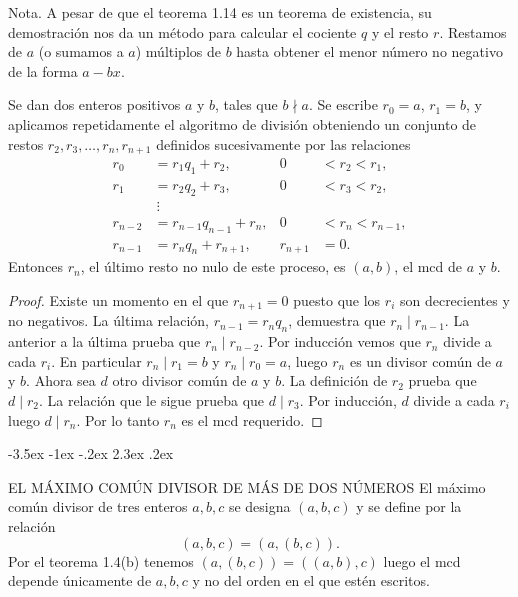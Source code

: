 \documentclass[12pt,a4paper]{book}
\makeatletter
\renewcommand\section{\@startsection{section}{1}{\z@}%
  {-3.5ex \@plus -1ex \@minus -.2ex}%
  {2.3ex \@plus .2ex}%
  {\normalfont\Large\bfseries\raggedright}}
\makeatother
\begin{document}
    Nota. A pesar de que el teorema 1.14 es un teorema de existencia, su demostración nos da
    un método para calcular el cociente $q$ y el resto $r$. Restamos de $a$ (o sumamos a $a$)
    múltiplos de $b$ hasta obtener el menor número no negativo de la forma $a-bx$.

    \begin{teorema}
        Se dan dos enteros positivos $a$ y $b$, tales que $b\nmid a$. Se escribe $r_{0}=a$,
        $r_{1}=b$, y aplicamos repetidamente el algoritmo de división obteniendo un conjunto de
        restos $r_{2},r_{3},\dots,r_{n},r_{n+1}$ definidos sucesivamente por las relaciones
        \begin{align*}
            r_{0}&=r_{1}q_{1}+r_{2}, & 0&<r_{2}<r_{1},\\
            r_{1}&=r_{2}q_{2}+r_{3}, & 0&<r_{3}<r_{2},\\
            &\ \vdots & &\\
            r_{n-2}&=r_{n-1}q_{n-1}+r_{n}, & 0&<r_{n}<r_{n-1},\\
            r_{n-1}&=r_{n}q_{n}+r_{n+1}, & r_{n+1}&=0.
        \end{align*}
        Entonces $r_{n}$, el último resto no nulo de este proceso, es $(a,b)$, el mcd de $a$ y
        $b$.
    \end{teorema}

    \begin{proof}
        Existe un momento en el que $r_{n+1}=0$ puesto que los $r_{i}$ son decrecientes y no
        negativos. La última relación, $r_{n-1}=r_{n}q_{n}$, demuestra que $r_{n}\mid r_{n-1}$. La
        anterior a la última prueba que $r_{n}\mid r_{n-2}$. Por inducción vemos que $r_{n}$
        divide a cada $r_{i}$. En particular $r_{n}\mid r_{1}=b$ y $r_{n}\mid r_{0}=a$, luego $r_{n}$ es
        un divisor común de $a$ y $b$. Ahora sea $d$ otro divisor común de $a$ y $b$. La
        definición de $r_{2}$ prueba que $d\mid r_{2}$. La relación que le sigue prueba que
        $d\mid r_{3}$. Por inducción, $d$ divide a cada $r_{i}$ luego $d\mid r_{n}$. Por lo tanto
        $r_{n}$ es el mcd requerido.
    \end{proof}

    \section{EL MÁXIMO COMÚN DIVISOR DE MÁS DE DOS NÚMEROS}
    El máximo común divisor de tres enteros $a,b,c$ se designa $(a,b,c)$ y se define por la
    relación
    \begin{equation*}
        (a,b,c)=(a,(b,c)).
    \end{equation*}
    Por el teorema 1.4(b) tenemos $(a,(b,c))=((a,b),c)$ luego el mcd depende únicamente de
    $a,b,c$ y no del orden en el que estén escritos.
\end{document}
